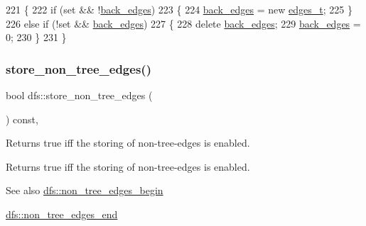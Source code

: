\begin{DoxyCode}
221 \{
222     \textcolor{keywordflow}{if} (\textcolor{keyword}{set} && !\mbox{\hyperlink{classdfs_a1dc18a7df8d6b238d5301c92fc7540fa}{back\_edges}})
223     \{
224         \mbox{\hyperlink{classdfs_a1dc18a7df8d6b238d5301c92fc7540fa}{back\_edges}} = \textcolor{keyword}{new} \mbox{\hyperlink{edge_8h_a8f9587479bda6cf612c103494b3858e3}{edges\_t}};
225     \}
226     \textcolor{keywordflow}{else} \textcolor{keywordflow}{if} (!\textcolor{keyword}{set} && \mbox{\hyperlink{classdfs_a1dc18a7df8d6b238d5301c92fc7540fa}{back\_edges}})
227     \{
228         \textcolor{keyword}{delete} \mbox{\hyperlink{classdfs_a1dc18a7df8d6b238d5301c92fc7540fa}{back\_edges}};
229         \mbox{\hyperlink{classdfs_a1dc18a7df8d6b238d5301c92fc7540fa}{back\_edges}} = 0;
230     \}
231 \}
\end{DoxyCode}
\mbox{\label{classdfs_a6ac1f01ff594fbbc6e8d6b5bd03fc9ab}} 
\subsubsection{\texorpdfstring{store\+\_\+non\+\_\+tree\+\_\+edges()}{store\_non\_tree\_edges()}\hspace{0.1cm}{\footnotesize\ttfamily [2/2]}}
{\footnotesize\ttfamily bool dfs\+::store\+\_\+non\+\_\+tree\+\_\+edges (\begin{DoxyParamCaption}{ }\end{DoxyParamCaption}) const\hspace{0.3cm}{\ttfamily [inline]}, {\ttfamily [inherited]}}



Returns true iff the storing of non-\/tree-\/edges is enabled. 

\begin{DoxyReturn}{Returns}
true iff the storing of non-\/tree-\/edges is enabled. 
\end{DoxyReturn}
\begin{DoxySeeAlso}{See also}
\mbox{\hyperlink{classdfs_a4efe5bb72d00305e6b226e67c2b2ef6e}{dfs\+::non\+\_\+tree\+\_\+edges\+\_\+begin}} 

\mbox{\hyperlink{classdfs_ad9cd92a18bda23edca8ab3ac60a15ef4}{dfs\+::non\+\_\+tree\+\_\+edges\+\_\+end}} 
\end{DoxySeeAlso}


